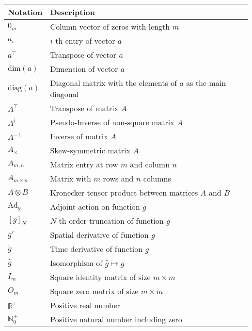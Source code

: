 \begin{spacing}{0.9}
\begin{multicols}{2}
\begin{table}[H]
\begin{tabular}{p{2.5cm} p{4cm}}
    
    \end{tabular}
\end{table}


\begin{table}[H]
\centering
    \begin{tabular}{p{1.5cm} p{5cm}} \hline
    \textbf{Notation}    &   \textbf{Description}\\ \hline
    $0_m$    & Column vector of zeros with length $m$ \\
    $a_i$ & $i$-th entry of vector $a$ \\
    $a^\top$ & Transpose of vector $a$ \\
    $\text{dim}(a)$ & Dimension of vector $a$ \\
    $\text{diag}(a)$ & Diagonal matrix with the elements of $a$ as the main diagonal\\
    $A^\top$ & Transpose of matrix $A$ \\
    $A^\dagger$ & Pseudo-Inverse of non-square matrix $A$ \\
    $A^{-1}$ & Inverse of matrix $A$ \\
    $A_\times$ & Skew-symmetric matrix $A$ \\
    $A_{m,n}$ & Matrix entry at row $m$ and column $n$ \\
    $A_{m \times n}$ & Matrix with $m$ rows and $n$ columns \\
    $A \otimes B$ & Kronecker tensor product between matrices $A$ and $B$ \\
    $\text{Ad}_g$ & Adjoint action on function $g$\\
    $[g]_N$ & $N$-th order truncation of function $g$\\ 
    $g'$ & Spatial derivative of function $g$ \\
    $\dot{g}$ & Time derivative of function $g$ \\
    $\hat{g}$ & Isomorphism of $\hat{g} \longmapsto g$ \\
    $I_m$    & Square identity matrix of size $m \times m$ \\
    $O_m$    & Square zero matrix of size $m \times m$ \\
    $\mathbb{R}^+$ & Positive real number\\
    $\mathbb{N}^+_0$ & Positive natural number including zero\\ \hline

    \end{tabular}
\end{table}



\end{multicols}
\end{spacing}

